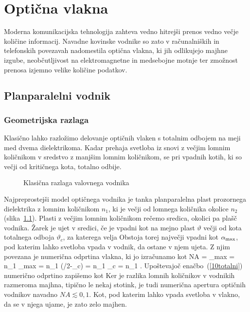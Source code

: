 
\chapter{Optična vlakna}
Moderna komunikacijska tehnologija zahteva vedno hitrejši prenos
vedno večje količine informacij. Navadne kovinske vodnike
so zato v računalniških in telefonskih povezavah nadomestila optična 
vlakna, ki jih odlikujejo majhne izgube, neobčutljivost na elektromagnetne
in medsebojne motnje ter zmožnost prenosa izjemno velike količine podatkov. 

\section{Planparalelni vodnik}
\subsection*{Geometrijska razlaga}
Klasično lahko razložimo delovanje optičnih vlaken s totalnim odbojem
na meji med dvema dielektrikoma. Kadar prehaja svetloba iz snovi 
z večjim lomnim količnikom v sredstvo z manjšim lomnim količnikom,
se pri vpadnih kotih, ki so večji od kritičnega kota, totalno odbije. 
\begin{figure}[h]
\centering
\def\svgwidth{120truemm} 

\caption{Klasična razlaga valovnega vodnika}
\label{fig:vodnik}
\end{figure}

Najpreprostejši model optičnega vodnika je tanka planparalelna plast prozornega
dielektrika z lomnim količnikom $n_{1}$, ki je večji od lomnega količnika
okolice $n_2$ (slika~\ref{fig:vodnik}). 
Plasti z večjim lomnim količnikom rečemo sredica, okolici
pa plašč vodnika. Žarek je ujet v sredici, če je vpadni kot 
na mejno plast $\vartheta$ večji od kota totalnega odboja $\vartheta_c$, 
za katerega velja 
Obstoja torej največji vpadni kot $\alpha_{\rm max}$, pod katerim lahko svetloba vpada v vodnik, da ostane v njem ujeta.
Z njim povezana je numerična odprtina vlakna, ki jo izračunamo kot 
\beq
NA = \sin \alpha_{\rm max} = n_1 \sin \beta_{\rm max} = 
n_1 \sin(\pi/2-\vartheta_c) =
n_1 \cos\vartheta_c = n_1 .
\label{10NAa}
\eeq
Upoštevajoč enačbo~(\ref{10totalni}) numerično odprtino zapišemo kot 
Ker je razlika lomnih količnikov v vodnikih razmeroma majhna,
tipično le nekaj stotink, je tudi numerična apertura optičnih 
vodnikov navadno
$NA \lesssim 0,1 $. Kot, pod katerim lahko vpada svetloba
v vlakno, da se v njega ujame, je zato zelo majhen. 

